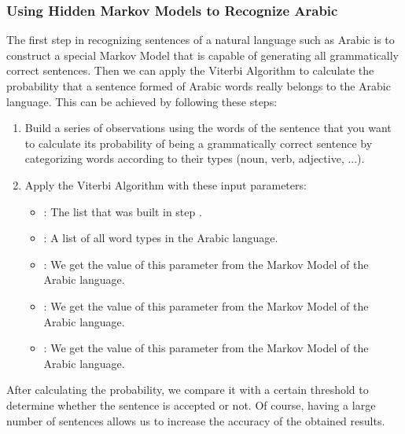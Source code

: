 \documentclass{acm_proc_article-sp}
\begin{document}
\subsubsection{Using Hidden Markov Models to Recognize Arabic}\label{Using-Hidden-Markov-Models}
The first step in recognizing sentences of a natural language such as Arabic is to construct a special Markov Model that is capable of generating all grammatically correct sentences. Then we can apply the Viterbi Algorithm to calculate the probability that a sentence formed of Arabic words really belongs to the Arabic language. This can be achieved by following these steps:
\begin{enumerate}
    \item Build a series of observations using the words of the sentence that you want to calculate its probability of being a grammatically correct sentence by categorizing words according to their types (noun, verb, adjective, ...).
    \item Apply the Viterbi Algorithm with these input parameters:
    \begin{itemize}
        \item : The list that was built in step .
        \item : A list of all word types in the Arabic language.
        \item : We get the value of this parameter from the Markov Model of the Arabic language.
        \item : We get the value of this parameter from the Markov Model of the Arabic language.
        \item : We get the value of this parameter from the Markov Model of the Arabic language.
    \end{itemize}
\end{enumerate}
After calculating the probability, we compare it with a certain threshold to determine whether the sentence is accepted or not. Of course, having a large number of sentences allows us to increase the accuracy of the obtained results.
\end{document}
